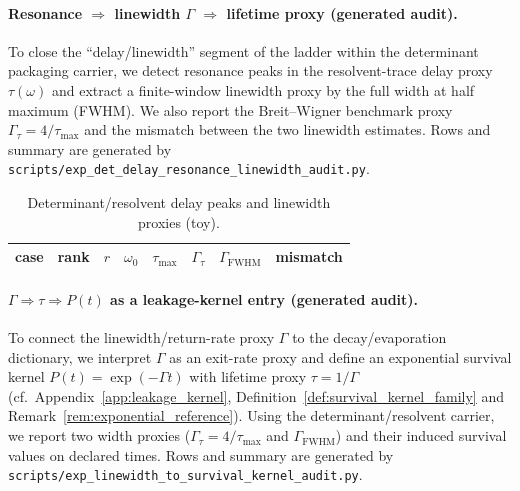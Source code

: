 %

\paragraph{Resonance $\Rightarrow$ linewidth $\Gamma$ $\Rightarrow$ lifetime proxy (generated audit).}
\AuditTag To close the ``delay/linewidth'' segment of the ladder within the determinant packaging carrier,
we detect resonance peaks in the resolvent-trace delay proxy $\tau(\omega)$ and extract a finite-window linewidth proxy by the full width at half maximum (FWHM).
We also report the Breit--Wigner benchmark proxy $\Gamma_{\tau}=4/\tau_{\max}$ and the mismatch between the two linewidth estimates.
Rows and summary are generated by \texttt{scripts/exp\_det\_delay\_resonance\_linewidth\_audit.py}.

\begin{table}[t]
\centering
\scriptsize
\setlength{\tabcolsep}{6pt}
\renewcommand{\arraystretch}{1.15}
\begin{tabular}{l r r r r r r r}
\toprule
case & rank & $r$ & $\omega_0$ & $\tau_{\max}$ & $\Gamma_{\tau}$ & $\Gamma_{\mathrm{FWHM}}$ & mismatch \\
\midrule

\end{tabular}
\caption{Determinant/resolvent delay peaks and linewidth proxies (toy).}
\label{tab:det_delay_linewidth_audit}
\end{table}

%

\paragraph{$\Gamma\Rightarrow\tau\Rightarrow P(t)$ as a leakage-kernel entry (generated audit).}
\AuditTag To connect the linewidth/return-rate proxy $\Gamma$ to the decay/evaporation dictionary, we interpret $\Gamma$ as an exit-rate proxy and define
an exponential survival kernel $P(t)=\exp(-\Gamma t)$ with lifetime proxy $\tau=1/\Gamma$ (cf.\ Appendix~\ref{app:leakage_kernel}, Definition~\ref{def:survival_kernel_family} and Remark~\ref{rem:exponential_reference}).
Using the determinant/resolvent carrier, we report two width proxies ($\Gamma_\tau=4/\tau_{\max}$ and $\Gamma_{\mathrm{FWHM}}$) and their induced survival values on declared times.
Rows and summary are generated by \texttt{scripts/exp\_linewidth\_to\_survival\_kernel\_audit.py}.

